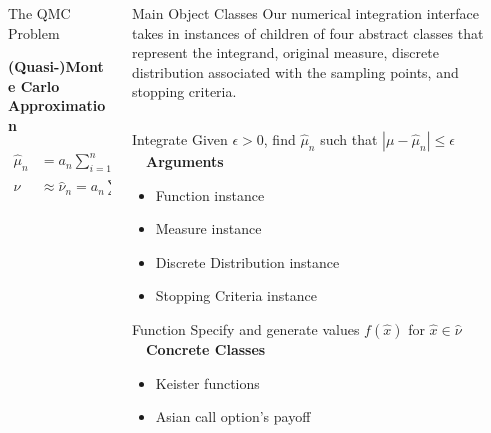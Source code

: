 \documentclass[final]{beamer}
\newcommand{\bfCenter}[1]{\centerline{\textbf{#1}}}
\newlength{\onecolwid}
\newlength{\twocolwid}
\newlength{\threecolwid}
\newcommand{\dif}{\mathrm{d}}
\begin{document}
\begin{frame}[t]
\begin{columns}[t]
\begin{column}{\threecolwid}
\begin{columns}[t,totalwidth=\threecolwid]
\begin{column}{\onecolwid}
\begin{block}{The QMC Problem}
    \vspace{2ex}
    \bfCenter{(Quasi-)Monte Carlo Approximation}
        \begin{align*}
            \hat{\mu}_n &= a_n \sum_{i=1}^{n} f(x_i)w_i =  \int_{X} f(x) \, \hat{\nu}( \dif x)
            \label{qmcApprox}
	\\ \nu & \approx \hat{\nu}_n = a_n \sum_{i=1}^n w_i \delta_{\hat{x_i}}(\cdot) 
            \text{ is discrete probability measure}
        \end{align*}
\end{block}
\end{column}


\begin{column}{\twocolwid}\vspace{-1in}
\begin{block}{Main Object Classes}
Our  numerical integration interface takes in instances of children of four abstract  classes that  represent the integrand,
original measure, discrete distribution associated with the sampling points, and stopping criteria.
\begin{column}{\onecolwid}  \vspace{-2ex}
\begin{alertblock}{Integrate}
    Given $\epsilon>0$, find $\hat{\mu}_n$ such that $\left | \mu - \hat{\mu}_n \right  | \leq \epsilon$ \\[1ex]~\
    \textbf{Arguments}
    \begin{itemize}
        \item Function instance
        \item Measure instance
        \item Discrete Distribution instance
        \item Stopping Criteria instance
    \end{itemize}
\end{alertblock}

\begin{alertblock}{Function}
    Specify and generate values $f(\hat{x})$ for $\hat{x} \in \hat{\nu}$ \\[1ex]~\
    \textbf{Concrete Classes}
    \begin{itemize}
        \item Keister functions \cite{keister1996multidimensional}
        \item Asian call option's payoff 
    \end{itemize}
\end{alertblock}


\end{column}
\end{block}
\end{column}
\end{columns}
\end{column}
\end{columns}
\end{frame}
\end{document}
